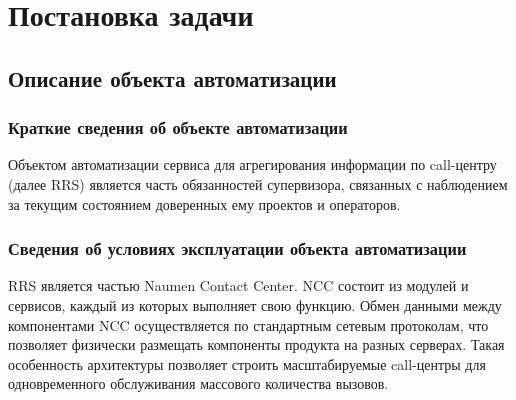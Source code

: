 \chapter{Постановка задачи}
\label{cha:analysis}
%
%

\section{Описание объекта автоматизации}

\subsection{Краткие сведения об объекте автоматизации}

Объектом автоматизации сервиса для агрегирования информации по call-центру (далее RRS) является часть обязанностей супервизора,
связанных с наблюдением за текущим состоянием доверенных ему проектов и операторов.

\subsection{Сведения об условиях эксплуатации объекта автоматизации}

RRS является частью Naumen Contact Center.
NCC состоит из модулей и сервисов, каждый из которых выполняет свою функцию.
Обмен данными между компонентами NCC осуществляется по стандартным сетевым протоколам,
что позволяет физически размещать компоненты продукта на разных серверах.
Такая особенность архитектуры позволяет строить масштабируемые call-центры
для одновременного обслуживания массового количества вызовов.


